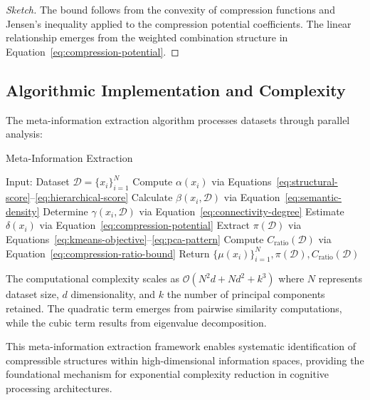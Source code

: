\begin{proof}[Sketch]
The bound follows from the convexity of compression functions and Jensen's inequality applied to the compression potential coefficients. The linear relationship emerges from the weighted combination structure in Equation~\eqref{eq:compression-potential}.
\end{proof}

\subsection{Algorithmic Implementation and Complexity}

The meta-information extraction algorithm processes datasets through parallel analysis:

\begin{algorithm}[H]
\caption{Meta-Information Extraction}
\begin{algorithmic}[1]
\STATE Input: Dataset $\mathcal{D} = \{x_i\}_{i=1}^N$
    \STATE Compute $\alpha(x_i)$ via Equations~\eqref{eq:structural-score}--\eqref{eq:hierarchical-score}
    \STATE Calculate $\beta(x_i, \mathcal{D})$ via Equation~\eqref{eq:semantic-density}
    \STATE Determine $\gamma(x_i, \mathcal{D})$ via Equation~\eqref{eq:connectivity-degree}
    \STATE Estimate $\delta(x_i)$ via Equation~\eqref{eq:compression-potential}
\ENDFOR
\STATE Extract $\pi(\mathcal{D})$ via Equations~\eqref{eq:kmeans-objective}--\eqref{eq:pca-pattern}
\STATE Compute $C_{\text{ratio}}(\mathcal{D})$ via Equation~\eqref{eq:compression-ratio-bound}
\STATE Return $\{\mu(x_i)\}_{i=1}^N, \pi(\mathcal{D}), C_{\text{ratio}}(\mathcal{D})$
\end{algorithmic}
\end{algorithm}

The computational complexity scales as $\mathcal{O}(N^2 d + N d^2 + k^3)$ where $N$ represents dataset size, $d$ dimensionality, and $k$ the number of principal components retained. The quadratic term emerges from pairwise similarity computations, while the cubic term results from eigenvalue decomposition.

This meta-information extraction framework enables systematic identification of compressible structures within high-dimensional information spaces, providing the foundational mechanism for exponential complexity reduction in cognitive processing architectures.

